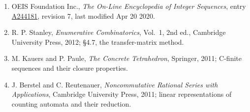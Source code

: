 \documentclass[11pt]{article}
\theoremstyle{definition}
\begin{document}
\begin{enumerate}

\item OEIS Foundation Inc., \emph{The On-Line Encyclopedia of Integer Sequences}, entry \href{https://oeis.org/A244181}{A244181}, revision 7, last modified Apr 20 2020.

\item R. P. Stanley, \emph{Enumerative Combinatorics}, Vol.~1, 2nd ed., Cambridge University Press, 2012; \S4.7, the transfer-matrix method.

\item M. Kauers and P. Paule, \emph{The Concrete Tetrahedron}, Springer, 2011; C-finite sequences and their closure properties.

\item J. Berstel and C. Reutenauer, \emph{Noncommutative Rational Series with Applications}, Cambridge University Press, 2011; linear representations of counting automata and their reduction.

\end{enumerate}
\end{document}
